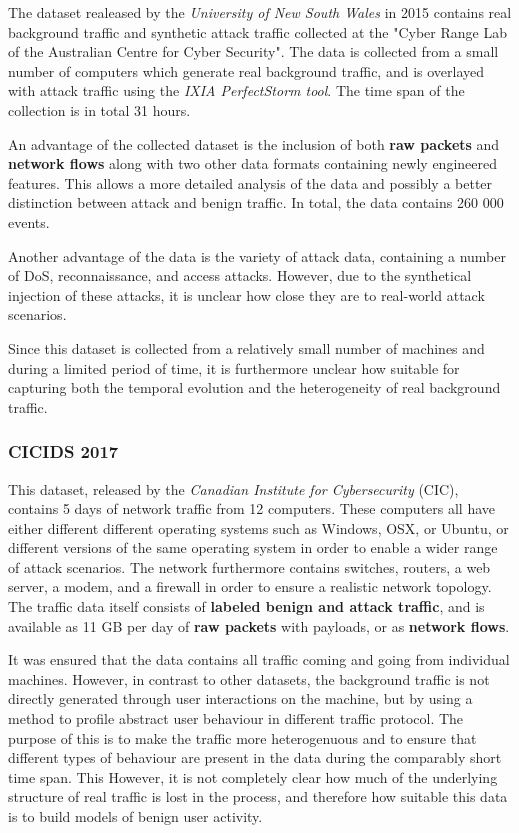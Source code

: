\documentclass[a4paper,12pt,twoside]{report}
\begin{document}
The dataset realeased by the \textit{University of New South Wales} in 2015 contains real background traffic and synthetic attack traffic collected at the "Cyber Range Lab of the Australian Centre for Cyber Security". The data is collected from a small number of computers which generate real background traffic, and is overlayed with attack traffic using the \textit{IXIA PerfectStorm tool}. The time span of the collection is in total 31 hours.

An advantage of the collected dataset is the inclusion of both \textbf{raw packets} and \textbf{network flows} along with two other data formats containing newly engineered features. This allows a more detailed analysis of the data and possibly a better distinction between attack and benign traffic. In total, the data contains 260 000 events.

Another advantage of the data is the variety of attack data, containing a number of DoS, reconnaissance, and access attacks. However, due to the synthetical injection of these attacks, it is unclear how close they are to real-world attack scenarios.

Since this dataset is collected from a relatively small number of machines and during a limited period of time, it is furthermore unclear how suitable for capturing both the temporal evolution and the heterogeneity of real background traffic.

\subsubsection*{CICIDS 2017 \cite{gharib2016evaluation}\cite{sharafaldin2018towards}}

This dataset, released by the \textit{Canadian Institute for Cybersecurity} (CIC), contains 5 days of network traffic from 12 computers. These computers all have either different different operating systems such as Windows, OSX, or Ubuntu, or different versions of the same operating system in order to enable a wider range of attack scenarios. The network  furthermore contains switches, routers, a web server, a modem, and a firewall in order to ensure a realistic network topology. The traffic data itself consists of \textbf{labeled benign and attack traffic}, and is available as 11 GB per day of \textbf{raw packets} with payloads, or as \textbf{network flows}. 

It was ensured that the data contains all traffic coming and going from individual machines. However, in contrast to other datasets, the background traffic is not directly generated through user interactions on the machine, but by using a method to profile abstract user behaviour in different traffic protocol. The purpose of this is to make the traffic more heterogenuous and to ensure that different types of behaviour are present in the data during the comparably short time span. This  However, it is not completely clear how much of the underlying structure of real traffic is lost in the process, and therefore how suitable this data is to build models of benign user activity.
\end{document}
